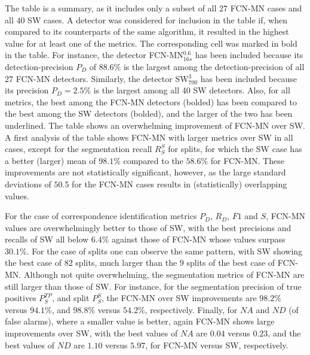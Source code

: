 \documentclass[a4paper,authoryear,review]{elsarticle}
\begin{document}
	The table is a summary, as it includes only a subset of all $27$ FCN-MN cases and all $40$ SW cases. A detector was considered for inclusion in the table if, when compared to its counterparts of the same algorithm, it resulted in the highest value for at least one of the metrics. The corresponding cell was marked in bold in the table. For instance, the detector FCN-MN$_{16s}^{0.6}$ has been included because its detection-precision $P_D$ of $88.6\%$ is the largest among the detection-precision of all $27$ FCN-MN detectors. Similarly, the detector SW$_{700}^3$ has been included because its precision $P_D = 2.5\%$ is the largest among all $40$ SW detectors. 
	Also, for all metrics, the best among the FCN-MN detectors (bolded) has been compared to the best among the SW detectors (bolded), and the larger of the two has been underlined.
	The table shows an overwhelming improvement of FCN-MN over SW. 
	A first analysis of the table shows FCN-MN with larger metrics over SW in all cases, except for the segmentation recall $R_S^{S}$ for splits, for which the SW case has a better (larger) mean of $98.1\%$ compared to the $58.6\%$ for FCN-MN. These improvements are not statistically significant, however, as the large standard deviations of $50.5$ for the FCN-MN cases results in (statistically) overlapping values. 
	
	For the case of correspondence identification metrics $P_D$, $R_D$, $F1$ and $S$, FCN-MN values are overwhelmingly better to those of SW, with the best precisions and recalls of SW all below $6.4\%$ against those of FCN-MN whose values surpass $30.1\%$. For the case of splits one can observe the same pattern, with SW showing the best case of $82$ splits, much larger than the $9$ splits of the best case of FCN-MN.
	Although not quite overwhelming, the segmentation metrics of FCN-MN are still larger than those of SW. For instance, for the segmentation precision of true positives $P_S^{TP}$, and split $P_S^{S}$, the FCN-MN over SW improvements are $98.2\%$ versus $94.1\%$, and $98.8\%$ versus $54.2\%$, respectively. 
	Finally, for $NA$ and $ND$ (of false alarms), where a smaller value is better, again FCN-MN shows large improvements over SW, with the best values of $NA$ are $0.04$ versus $0.23$, and the best values of $ND$ are $1.10$ versus $5.97$, for FCN-MN versus SW, respectively. 
	
\end{document}
